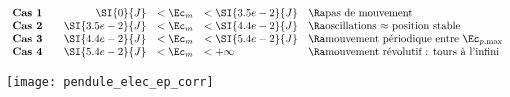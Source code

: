 \documentclass[a4paper, 12pt, final, garamond]{book}
\begin{document}
\begin{enumerate}
        \[
            \begin{array}{lrcll}
                \textbf{Cas 1} &\quad \SI{0}{J} &< \Ec_m &< \SI{3.5e-2}{J} & \Ra
                \text{pas de mouvement}
                \\
                \textbf{Cas 2} &\quad \SI{3.5e-2}{J} &< \Ec_m &< \SI{4.4e-2}{J} & \Ra
                \text{oscillations $\approx$ position stable}
                \\
                \textbf{Cas 3} &\quad \SI{4.4e-2}{J} &< \Ec_m &< \SI{5.4e-2}{J} & \Ra
                \text{mouvement périodique entre $\Ec_{p,\max}$}
                \\
                \textbf{Cas 4} &\quad \SI{5.4e-2}{J} &< \Ec_m &< +\infty & \Ra
                \text{mouvement révolutif~: tours à l'infini}
            \end{array}
        \]
        \begin{center}
            \texttt{[image: pendule\_elec\_ep\_corr]}
            \label{fig:pend_elec_em}
        \end{center}
\end{enumerate}
\end{document}
